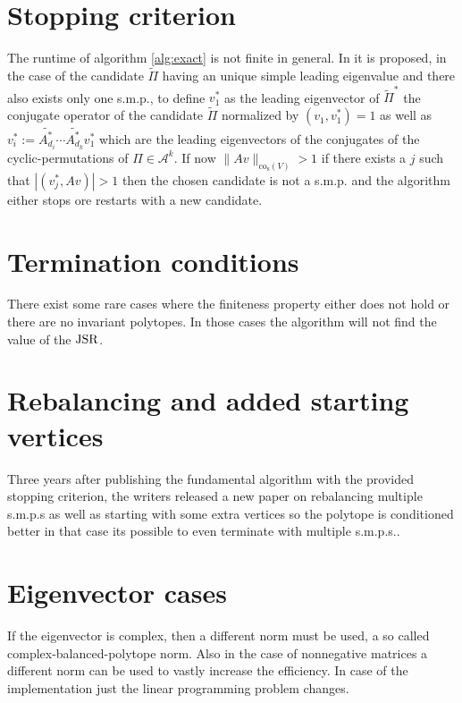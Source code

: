 

\section{Stopping criterion}
The runtime of algorithm \ref{alg:exact} is not finite in general. 
In \citep{guglielmiExactComputationJoint2013} it is proposed, in the case of the candidate $\tilde{\Pi}$ having an unique simple leading eigenvalue and there also exists only one s.m.p., to define $v_1^{*}$ as the leading eigenvector of $\tilde{\Pi}^{*}$ the conjugate operator of the candidate $\tilde{\Pi}$ normalized by $(v_1, v_1^{*}) = 1$ as well as $v_i^{*} := \tilde{A_{d_i}^{*}} \cdots \tilde{A_{d_k}^{*}} v_1^{*}$ which are the leading eigenvectors of the conjugates of the cyclic-permutations of $\Pi \in \mathcal{A}^k$.
If now $\lVert Av \rVert _{\text{co}_{\text{s}}(V)}  > 1$ if there exists a $j$
such that $| ( v_j^{*}, Av) | > 1$ then the chosen candidate is not a s.m.p. and the algorithm either stops ore restarts with a new candidate. 

\section{Termination conditions}
There exist some rare cases where the finiteness property either does not hold or there are no invariant polytopes. In those cases the algorithm will not find the value of the $\operatorname{JSR}$.

\section{Rebalancing and added starting vertices}
Three years after publishing the fundamental algorithm with the provided stopping criterion, the writers released a new paper on rebalancing multiple s.m.p.s as well as starting with some extra vertices so the polytope is conditioned better \citep{guglielmi2016invariant} in that case its possible to even terminate with multiple s.m.p.s..

\section{Eigenvector cases}
If the eigenvector is complex, then a different norm must be used, a so called complex-balanced-polytope norm. 
Also in the case of nonnegative matrices a different norm can be used to vastly increase the efficiency. 
In case of the implementation just the linear programming problem changes. 



